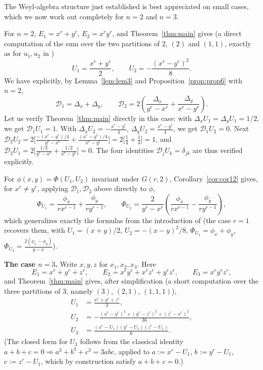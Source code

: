 \documentclass[11pt]{article}
\theoremstyle{remark}
\begin{document}
The Weyl-algebra structure just established is best appreciated on small cases, which we now work out completely for $n=2$ and $n=3$.

For $n=2$, $E_1=x^r+y^r$, $E_2=x^ry^r$, and Theorem~\ref{thm:main} gives (a direct computation of the sum over the two partitions of $2$, $(2)$ and $(1,1)$, exactly as for $u_1,u_2$ in \cite{Ze})
\[
U_1 = \frac{x^r+y^r}{2}, \qquad U_2 = -\frac{(x^r-y^r)^2}{8}.
\]
We have explicitly, by Lemma~\ref{lem:lem3} and Proposition~\ref{prop:prop6} with $n=2$,
\[
\mathcal D_1 = \Delta_x+\Delta_y, \qquad \mathcal D_2 = 2\left(\frac{\Delta_x}{y^r-x^r}+\frac{\Delta_y}{x^r-y^r}\right).
\]
Let us verify Theorem~\ref{thm:main} directly in this case: with $\Delta_xU_1=\Delta_yU_1=1/2$, we get $\mathcal D_1U_1=1$. With $\Delta_xU_2=-\frac{x^r-y^r}{4}$, $\Delta_yU_2=\frac{x^r-y^r}{4}$, we get $\mathcal D_1U_2=0$. Next $\mathcal D_2U_2 = 2\big[\frac{-(x^r-y^r)/4}{y^r-x^r}+\frac{(x^r-y^r)/4}{x^r-y^r}\big]=2\big[\frac14+\frac14\big]=1$, and $\mathcal D_2U_1=2\big[\frac{1/2}{y^r-x^r}+\frac{1/2}{x^r-y^r}\big]=0$. The four identities $\mathcal D_jU_k=\delta_{jk}$ are thus verified explicitly.

For $\phi(x,y)=\Phi(U_1,U_2)$ invariant under $G(r,2)$, Corollary~\ref{cor:cor12} gives, for $x^r\ne y^r$, applying $\mathcal D_1,\mathcal D_2$ above directly to $\phi$,
\[
\Phi_{U_1} = \frac{\phi_x}{r x^{r-1}} + \frac{\phi_y}{r y^{r-1}}, \qquad
\Phi_{U_2} = \frac{2}{y^r-x^r}\left(\frac{\phi_x}{r x^{r-1}} - \frac{\phi_y}{r y^{r-1}}\right),
\]
which generalizes exactly the formulas from the introduction of \cite{Ze} (the case $r=1$ recovers them, with $U_1=(x+y)/2$, $U_2=-(x-y)^2/8$, $\Phi_{U_1}=\phi_x+\phi_y$, $\Phi_{U_2}=\frac{2(\phi_x-\phi_y)}{y-x}$).

\bigskip
\noindent\textbf{The case $n=3$.} Write $x,y,z$ for $x_1,x_2,x_3$. Here
\[
E_1=x^r+y^r+z^r,\qquad E_2=x^ry^r+x^rz^r+y^rz^r,\qquad E_3=x^ry^rz^r,
\]
and Theorem~\ref{thm:main} gives, after simplification (a short computation over the three partitions of $3$, namely $(3)$, $(2,1)$, $(1,1,1)$),
\begin{align*}
U_1&=\frac{x^r+y^r+z^r}{3},\\
U_2&=-\frac{(x^r-y^r)^2+(y^r-z^r)^2+(z^r-x^r)^2}{36},\\
U_3&=\frac{(x^r-U_1)(y^r-U_1)(z^r-U_1)}{6}.
\end{align*}
(The closed form for $U_3$ follows from the classical identity $a+b+c=0\Rightarrow a^3+b^3+c^3=3abc$, applied to $a:=x^r-U_1$, $b:=y^r-U_1$, $c:=z^r-U_1$, which by construction satisfy $a+b+c=0$.)
\end{document}
